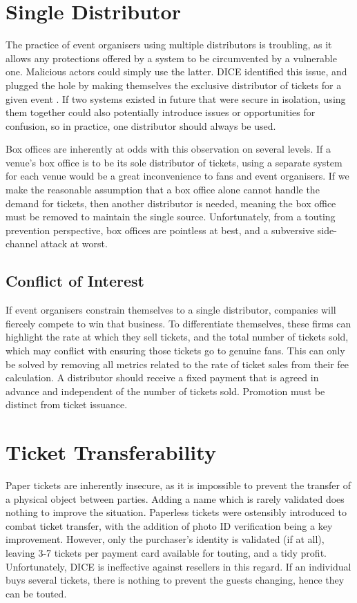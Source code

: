 \documentclass[12pt,a4paper]{bhamdissertation}
\begin{document}
\section{Single Distributor}

The practice of event organisers using multiple distributors is troubling, as it allows any protections offered by a system to be circumvented by a vulnerable one. Malicious actors could simply use the latter. DICE identified this issue, and plugged the hole by making themselves the exclusive distributor of tickets for a given event \cite{D16}. If two systems existed in future that were secure in isolation, using them together could also potentially introduce issues or opportunities for confusion, so in practice, one distributor should always be used.

Box offices are inherently at odds with this observation on several levels. If a venue's box office is to be its sole distributor of tickets, using a separate system for each venue would be a great inconvenience to fans and event organisers. If we make the reasonable assumption that a box office alone cannot handle the demand for tickets, then another distributor is needed, meaning the box office must be removed to maintain the single source. Unfortunately, from a touting prevention perspective, box offices are pointless at best, and a subversive side-channel attack at worst.

\subsection{Conflict of Interest}

If event organisers constrain themselves to a single distributor, companies will fiercely compete to win that business. To differentiate themselves, these firms can highlight the rate at which they sell tickets, and the total number of tickets sold, which may conflict with ensuring those tickets go to genuine fans. This can only be solved by removing all metrics related to the rate of ticket sales from their fee calculation. A distributor should receive a fixed payment that is agreed in advance and independent of the number of tickets sold. Promotion must be distinct from ticket issuance.

\section{Ticket Transferability}

Paper tickets are inherently insecure, as it is impossible to prevent the transfer of a physical object between parties. Adding a name which is rarely validated does nothing to improve the situation. Paperless tickets were ostensibly introduced to combat ticket transfer, with the addition of photo ID \cite{B07} verification being a key improvement. However, only the purchaser's identity is validated (if at all), leaving 3-7 tickets per payment card available for touting, and a tidy profit. Unfortunately, DICE is ineffective against resellers in this regard. If an individual buys several tickets, there is nothing to prevent the guests changing, hence they can be touted.
\end{document}
